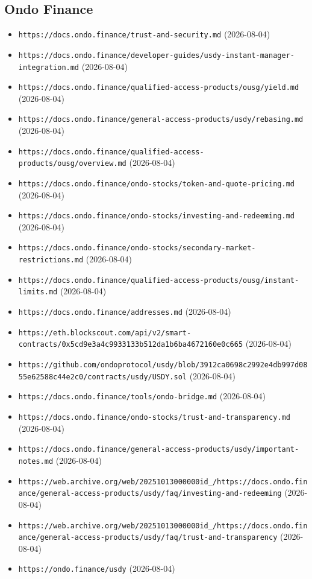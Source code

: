 \subsection*{Ondo Finance}
\begin{itemize}\setlength{\itemsep}{0pt}\small
\item \texttt{https://docs.ondo.finance/trust-and-security.md} (2026-08-04)
\item \texttt{https://docs.ondo.finance/developer-guides/usdy-instant-manager-integration.md} (2026-08-04)
\item \texttt{https://docs.ondo.finance/qualified-access-products/ousg/yield.md} (2026-08-04)
\item \texttt{https://docs.ondo.finance/general-access-products/usdy/rebasing.md} (2026-08-04)
\item \texttt{https://docs.ondo.finance/qualified-access-products/ousg/overview.md} (2026-08-04)
\item \texttt{https://docs.ondo.finance/ondo-stocks/token-and-quote-pricing.md} (2026-08-04)
\item \texttt{https://docs.ondo.finance/ondo-stocks/investing-and-redeeming.md} (2026-08-04)
\item \texttt{https://docs.ondo.finance/ondo-stocks/secondary-market-restrictions.md} (2026-08-04)
\item \texttt{https://docs.ondo.finance/qualified-access-products/ousg/instant-limits.md} (2026-08-04)
\item \texttt{https://docs.ondo.finance/addresses.md} (2026-08-04)
\item \texttt{https://eth.blockscout.com/api/v2/smart-contracts/0x5cd9e3a4c9933133b512da1b6ba4672160e0c665} (2026-08-04)
\item \texttt{https://github.com/ondoprotocol/usdy/blob/3912ca0698c2992e4db997d0855e62588c44e2c0/contracts/usdy/USDY.sol} (2026-08-04)
\item \texttt{https://docs.ondo.finance/tools/ondo-bridge.md} (2026-08-04)
\item \texttt{https://docs.ondo.finance/ondo-stocks/trust-and-transparency.md} (2026-08-04)
\item \texttt{https://docs.ondo.finance/general-access-products/usdy/important-notes.md} (2026-08-04)
\item \texttt{https://web.archive.org/web/20251013000000id\_/https://docs.ondo.finance/general-access-products/usdy/faq/investing-and-redeeming} (2026-08-04)
\item \texttt{https://web.archive.org/web/20251013000000id\_/https://docs.ondo.finance/general-access-products/usdy/faq/trust-and-transparency} (2026-08-04)
\item \texttt{https://ondo.finance/usdy} (2026-08-04)
\end{itemize}


